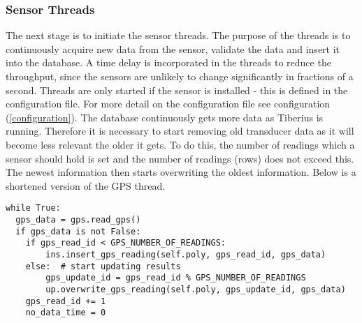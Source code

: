 \subsubsection{Sensor Threads}
The next stage is to initiate the sensor threads. The purpose of the threads is to continuously acquire new data from the sensor, validate the data and insert it into the database. A time delay is incorporated in the threads to reduce the throughput, since the sensors are unlikely to change significantly in fractions of a second.
\newline
Threads are only started if the sensor is installed - this is defined in the configuration file. For more detail on the configuration file see configuration (\ref{configuration}).
\newline
The database continuously gets more data as Tiberius is running. Therefore it is necessary to start removing old transducer data as it will become less relevant the older it gets. To do this, the number of readings which a sensor should hold is set and the number of readings (rows) does not exceed this.  The newest information then starts overwriting the oldest information. 
\newline
Below is a shortened version of the GPS thread.
\begin{lstlisting}[style=custompython]
while True:
  gps_data = gps.read_gps()
  if gps_data is not False:
    if gps_read_id < GPS_NUMBER_OF_READINGS:
   		ins.insert_gps_reading(self.poly, gps_read_id, gps_data)
    else:  # start updating results
   		gps_update_id = gps_read_id % GPS_NUMBER_OF_READINGS
    	up.overwrite_gps_reading(self.poly, gps_update_id, gps_data)
    gps_read_id += 1
    no_data_time = 0
\end{lstlisting}

